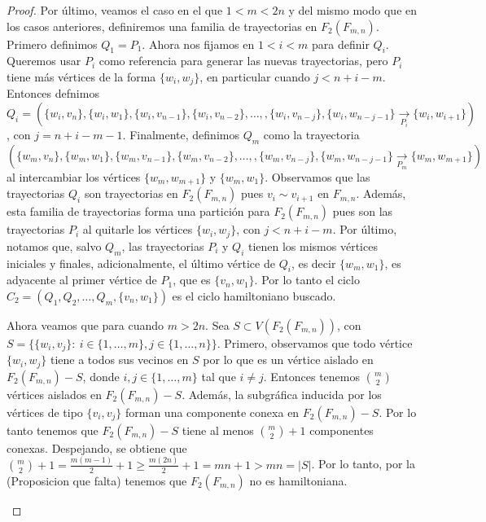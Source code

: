 \begin{proof}
    Por \'ultimo, veamos el caso en el que $1<m<2n$ y del mismo modo que en los
    casos anteriores, definiremos una familia de trayectorias en $F_2(F_{m,n})$.
    Primero definimos $Q_1 =P_1$. Ahora nos fijamos en $1<i<m$ para definir
    $Q_i$. Queremos usar $P_i$ como referencia para generar las nuevas
    trayectorias, pero $P_i$ tiene m\'as v\'ertices de la forma $\{w_i,w_j\}$,
    en particular cuando $j< n+i-m$. Entonces defnimos $Q_i =
    (\{w_i,v_n\},\{w_i,w_1\},\{w_i,v_{n-1}\},\{w_i,v_{n-2}\}, \dots,
    ,\{w_i,v_{n-j}\},\{w_i,w_{n-j-1}\}\xrightarrow[P_i]{}\{w_i,w_{i+1}\})$, con
    $j = n+i-m-1$. Finalmente, definimos $Q_m$ como la trayectoria
    $(\{w_m,v_n\},\{w_m,w_1\},\{w_m,v_{n-1}\},\{w_m,v_{n-2}\}, \dots,
    ,\{w_m,v_{n-j}\},\{w_m,w_{n-j-1}\}\xrightarrow[P_m]{}\{w_m,w_{m+1}\})$ al
    intercambiar los v\'ertices $\{w_m,w_{m+1}\}$ y $\{w_m,w_1\}$. Observamos
    que las trayectorias $Q_i$ son trayectorias en $F_2(F_{m,n})$ pues $v_i \sim
    v_{i+1}$ en $F_{m,n}$. Adem\'as, esta familia de trayectorias forma una
    partici\'on para $F_2(F_{m,n})$ pues son las trayectorias $P_i$ al quitarle
    los v\'ertices $\{w_i,w_j\}$, con $j< n+i-m$. Por \'ultimo, notamos que,
    salvo $Q_m$, las trayectorias $P_i$ y $Q_i$ tienen los mismos v\'ertices
    iniciales y finales, adicionalmente, el \'ultimo v\'ertice de $Q_i$, es
    decir $\{w_m,w_1\}$, es adyacente al primer v\'ertice de $P_1$, que es
    $\{v_n,w_1\}$. Por lo tanto el ciclo $C_2=(Q_1,Q_2, \dots, Q_m,
    \{v_n,w_1\})$ es el ciclo hamiltoniano buscado.

    Ahora veamos que para cuando $m>2n$. Sea $S \subset V(F_2(F_{m,n}))$, con
    $S=\{\{w_i,v_j\} \colon\ i \in \{1,\dots,m\},j\in\{1,\dots,n\}\}$. Primero,
    observamos que todo v\'ertice $\{w_i,w_j\}$ tiene a todos sus vecinos en $S$
    por lo que es un v\'ertice aislado en $F_2(F_{m,n})-S$, donde $i,j \in
    \{1,\dots,m\}$ tal que $i \neq j$. Entonces tenemos $\binom{m}{2}$
    v\'ertices aislados en $F_2(F_{m,n})-S$. Adem\'as, la subgr\'afica inducida
    por los v\'ertices de tipo $\{v_i,v_j\}$ forman una componente conexa en
    $F_2(F_{m,n})-S$. Por lo tanto tenemos que $F_2(F_{m,n})-S$ tiene al menos
    $\binom{m}{2} + 1$ componentes conexas. Despejando, se obtiene que
    $\binom{m}{2} + 1 = \frac{m(m-1)}{2} + 1 \geq \frac{m(2n)}{2} + 1 = mn + 1 >
    mn = |S|$. Por lo tanto, por la (Proposicion que falta) tenemos que
    $F_2(F_{m,n})$ no es hamiltoniana.


    \begin{figure}[ht!]
        \centering
           \begin{tikzpicture}
        

\end{tikzpicture}
\end{figure}
\end{proof}
